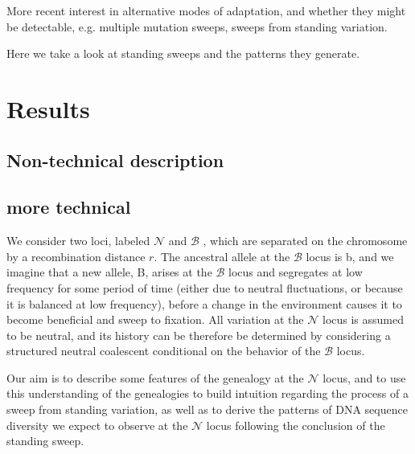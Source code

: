 \documentclass[a4paper,10pt]{article}
\newcommand{\fancyN}{$\mathcal N$ }
\newcommand{\fancyB}{$\mathcal B$ }
\begin{document}
More recent interest in alternative modes of adaptation, and whether they might be detectable, e.g. multiple mutation sweeps, sweeps from standing variation.

Here we take a look at standing sweeps and the patterns they generate.

\section{Results}

\subsection{Non-technical description}



\subsection{more technical}

We consider two loci, labeled \fancyN and \fancyB, which are separated on the chromosome by a recombination distance $r$. The ancestral allele at the \fancyB locus is b, and we imagine that a new allele, B, arises at the \fancyB locus and segregates at low frequency for some period of time (either due to neutral fluctuations, or because it is balanced at low frequency), before a change in the environment causes it to become beneficial and sweep to fixation. All variation at the \fancyN locus is assumed to be neutral, and its history can be therefore be determined by considering a structured neutral coalescent conditional on the behavior of the \fancyB locus.

Our aim is to describe some features of the genealogy at the \fancyN locus, and to use this understanding of the genealogies to build intuition regarding the process of a sweep from standing variation, as well as to derive the patterns of DNA sequence diversity we expect to observe at the \fancyN locus following the conclusion of the standing sweep.
\end{document}
